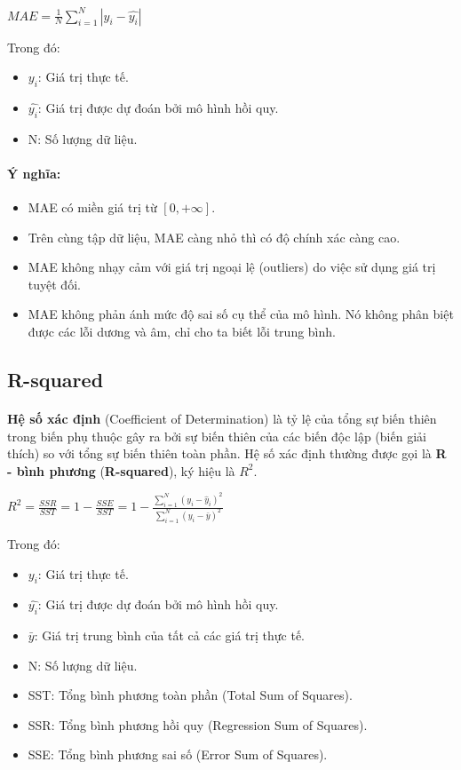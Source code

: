 \begin{center}
\large $MAE = \frac{1}{N}\sum_{i=1}^{N}\left| y_{i}-\hat{y_{i}} \right|$
\end{center}

Trong đó:
\begin{itemize}
    \item $y_{i}$: Giá trị thực tế.
    \item $\hat{y_{i}}$: Giá trị được dự đoán bởi mô hình hồi quy.
    \item N: Số lượng dữ liệu.
\end{itemize}

\paragraph{Ý nghĩa:}{}
\begin{itemize}
\item MAE có miền giá trị từ $[0,+\infty ]$. 
\item Trên cùng tập dữ liệu, MAE càng nhỏ thì có độ chính xác càng cao.
\item MAE không nhạy cảm với giá trị ngoại lệ (outliers) do việc sử dụng giá trị tuyệt đối.
\item MAE không phản ánh mức độ sai số cụ thể của mô hình. Nó không phân biệt được các lỗi dương và âm, chỉ cho ta biết lỗi trung bình.
\end{itemize}

\subsection{R-squared}

\paragraph{}{\textbf{Hệ số xác định} (Coefficient of Determination) \cite{xstk} là tỷ lệ của tổng sự biến thiên trong biến phụ thuộc gây ra bởi sự biến thiên của các biến độc lập (biến giải thích) so với tổng sự biến thiên toàn phần. Hệ số xác định thường được gọi là \textbf{R - bình phương} (\textbf{R-squared}), ký hiệu là $R^2$.}

\begin{center}
\large $R^{2} = \frac{SSR}{SST} = 1 - \frac{SSE}{SST} = 1 - \frac{\sum_{i=1}^{N} (y_i - \hat{y}_i)^2}{\sum_{i=1}^{N} (y_i - \bar{y})^2}$
\end{center}

Trong đó:
\begin{itemize}
    \item $y_{i}$: Giá trị thực tế.
    \item $\hat{y_{i}}$: Giá trị được dự đoán bởi mô hình hồi quy.
    \item $\bar{y}$: Giá trị trung bình của tất cả các giá trị thực tế.
    \item N: Số lượng dữ liệu.
    \item SST: Tổng bình phương toàn phần (Total Sum of Squares).
    \item SSR: Tổng bình phương hồi quy (Regression Sum of Squares).
    \item SSE: Tổng bình phương sai số (Error Sum of Squares).
\end{itemize}

